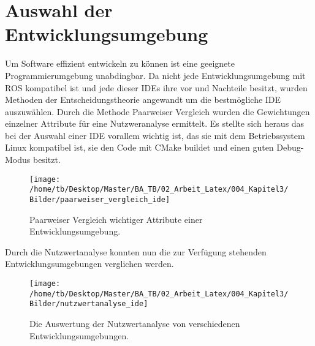 %

\chapter{Auswahl der Entwicklungsumgebung}
\label{cha:Auswahl der Entwicklungsumgebung} 

Um Software effizient entwickeln zu k{\"o}nnen ist eine geeignete Programmierumgebung unabdingbar. 
Da nicht jede Entwicklungsumgebung mit ROS kompatibel ist und jede dieser IDEs ihre vor und Nachteile besitzt, wurden Methoden der Entscheidungstheorie angewandt um die bestm{\"o}gliche IDE auszuw{\"a}hlen. Durch die Methode Paarweiser Vergleich wurden die Gewichtungen einzelner Attribute f\"ur eine Nutzweranalyse ermittelt. Es stellte sich heraus das bei der Auswahl einer IDE vorallem wichtig ist, das sie mit dem Betriebssystem Linux kompatibel ist, sie den Code mit CMake buildet und einen guten Debug-Modus besitzt.

\begin{figure}[H]
\begin{center}
  \texttt{[image: /home/tb/Desktop/Master/BA\_TB/02\_Arbeit\_Latex/004\_Kapitel3/Bilder/paarweiser\_vergleich\_ide]}%
  \caption[Paarweiser Vergleich der Entwicklungsumgebungen]%
           {\label{fig:Paarweiser Vergleich der Entwicklungsumgebungen}%
           Paarweiser Vergleich wichtiger Attribute einer Entwicklungsumgebung.}
\end{center}
\end{figure}

Durch die Nutzwertanalyse konnten nun die zur Verf\"ugung stehenden Entwicklungsumgebungen verglichen werden. 

\begin{figure}[H]
\begin{center}
  \texttt{[image: /home/tb/Desktop/Master/BA\_TB/02\_Arbeit\_Latex/004\_Kapitel3/Bilder/nutzwertanalyse\_ide]}%
  \caption[Die Auswertung der Nutzwertanalyse der Entwicklungsumgebungen]%
           {\label{fig:Die Auswertung der Nutzwertanalyse der Entwicklungsumgebungen}%
           Die Auswertung der Nutzwertanalyse von verschiedenen Entwicklungsumgebungen.}
\end{center}
\end{figure}



